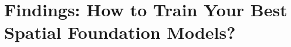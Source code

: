 \documentclass{llmxive}
\begin{document}
\section{Findings: How to Train Your Best Spatial Foundation Models?}
\end{document}
